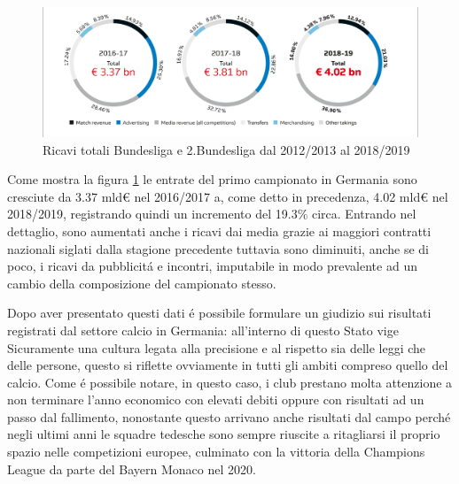 \documentclass[
    corpo=11.5pt,
    oneside,
    evenboxes,
    tipotesi=triennale,
    stile=classica,
    oldstyle,
    autoretitolo,
    greek,
]{toptesi}
\begin{document}
\begin{interlinea}{1.5}
\begin{figure}
    \centering
    \includegraphics[scale=.5]{img/bundes_entrate.png}
    \caption{Ricavi totali Bundesliga e 2.Bundesliga dal 2012/2013 al 2018/2019}
    \label{entrate_bundes}
\end{figure}
Come mostra la figura \ref{entrate_bundes} le entrate del primo campionato in Germania sono cresciute da 3.37 mld€ nel 2016/2017
a, come detto in precedenza, 4.02 mld€ nel 2018/2019, registrando quindi un incremento del 19.3\% circa. Entrando nel dettaglio, sono aumentati
anche i ricavi dai media grazie ai maggiori contratti nazionali siglati dalla stagione precedente tuttavia sono diminuiti, anche se di poco,
i ricavi da pubblicit\'a e incontri, imputabile in modo prevalente ad un cambio della composizione del campionato stesso.


Dopo aver presentato questi dati \'e possibile formulare un giudizio sui risultati registrati dal settore calcio in Germania: all'interno
di questo Stato vige Sicuramente una cultura legata alla precisione e al rispetto sia delle leggi che delle persone, questo si riflette 
ovviamente in tutti gli ambiti compreso quello del calcio. Come \'e possibile notare, in questo caso, i club prestano molta attenzione a non 
terminare l'anno economico con elevati debiti oppure con risultati ad un passo dal fallimento, nonostante questo arrivano anche risultati dal 
campo perch\'e negli ultimi anni le squadre tedesche sono sempre riuscite a ritagliarsi il proprio spazio nelle competizioni europee, 
culminato con la vittoria della Champions League da parte del Bayern Monaco nel 2020. 


\end{interlinea}
\end{document}
